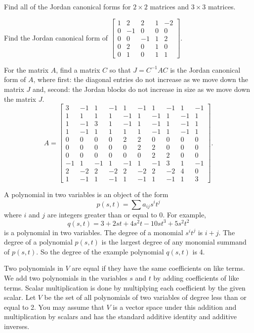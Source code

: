 \item Find all of the Jordan canonical forms for $2 \times 2$ matrices and $3 \times 3$ matrices. 

\item Find the Jordan canonical form of $\left[ \begin{array}{crrcr} 1&2&2&1&-2\\0&-1&0&0&0 \\ 0&0&-1&1&2 \\ 0&2&0&1&0 \\ 0&1&0&1&1 \end{array} \right]$. 

\item For the matrix $A$, find a matrix $C$ so that $J = C^{-1}AC$ is the Jordan canonical form of $A$, where first: the diagonal entries do not increase as we move down the matrix $J$ and, second: the Jordan blocks do not increase in size as we move down the matrix $J$. 
\[A =  \left[ \begin{array}{rrrrrrrrrr} 
3&-1&1&-1&1&-1&1&-1&1&-1 \\ 
1&1&1&1&-1&1&-1&1&-1&1 \\ 
1&-1&3&1&-1&1&-1&1&-1&1\\ 
1&-1&1&1&1&1&-1&1&-1&1  \\ 
0&0&0&0&2&2&0&0&0&0 \\ 
0&0&0&0&0&2&2&0&0&0\\ 
0&0&0&0&0&0&2&2&0&0\\ 
-1&1&-1&1&-1&1&-1&3&1&-1\\ 
2&-2&2&-2&2&-2&2&-2&4&0\\ 
1&-1&1&-1&1&-1&1&-1&1&3
\end{array} \right].\]

\item A polynomial in two variables is an object of the form
\[p(s,t) = \sum a_{ij}s^it^j\]
where $i$ and $j$ are integers greater than or equal to 0. For example, 
\[q(s,t) = 3 + 2st + 4s^2t - 10st^3+5s^2t^2\]
is a polynomial in two variables. The degree of a monomial $s^it^j$ is $i+j$. The degree of a polynomial $p(s,t)$ is the largest degree of any monomial summand of $p(s,t)$. So the degree of the example polynomial $q(s,t)$ is 4. 

Two polynomials in $V$ are equal if they have the same coefficients on like terms. We add two polynomials in the variables $s$ and $t$ by adding coefficients of like terms. Scalar multiplication is done by multiplying each coefficient by the given scalar. Let $V$ be the set of all polynomials of two variables of degree less than or equal to 2. You may assume that $V$ is a vector space under this addition and multiplication by scalars and has the standard additive identity and additive inverses. 


